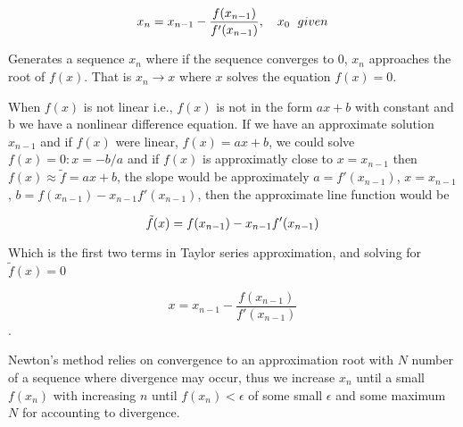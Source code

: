 \documentclass[11pt]{article}
\begin{document}
\[x_n = x_{n-1} - 
  \frac{f(x_{n-1})}{f'(x_{n-1})}, 
  \quad x_{0} \hspace{6 px} given \\ \\ \]

Generates a sequence \(x_n\) where if the sequence converges to 0,
\(x_n\) approaches the root of \(f(x)\). That is \(x_n \rightarrow x\)
where \(x\) solves the equation \(f(x) = 0\).

When \(f(x)\) is not linear i.e., \(f(x)\) is not in the form \(ax+b\)
with constant and b we have a nonlinear difference equation. If we have
an approximate solution \(x_{n-1}\) and if \(f(x)\) were linear,
\(f(x) = ax+b\), we could solve \(f(x) = 0:x = -b/a\) and if \(f(x)\) is
approximatly close to \(x = x_{n-1}\) then
\(f(x) \approx \tilde{f} = ax+b\), the slope would be approximately
\(a = f'(x_{n-1})\), \(x = x_{n-1}\),
\(b=f(x_{n-1})-x_{n-1}f'(x_{n-1})\), then the approximate line function
would be

\[\tilde{f}(x)=f(x_{n-1})-x_{n-1}f'(x_{n-1}) \\ \\ \]

Which is the first two terms in Taylor series approximation, and solving
for \(\tilde{f}(x)=0\)

\[x=x_{n-1}-\frac{f(x_{n-1})}{f'(x_{n-1})}\].

Newton's method relies on convergence to an approximation root with
\(N\) number of a sequence where divergence may occur, thus we increase
\(x_n\) until a small \(f(x_n)\) with increasing \(n\) until
\(f(x_n) < \epsilon\) of some small \(\epsilon\) and some maximum \(N\)
for accounting to divergence.
\end{document}
